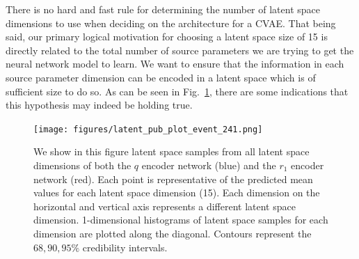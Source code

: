 %
%

There is no hard and fast rule for determining the number of latent 
space dimensions to use when deciding on the architecture for a \ac{CVAE}. 
That being said, our primary logical motivation for choosing a latent 
space size of 15 is directly related to the total number of source 
parameters we are trying to get the neural network model to learn. 
We want to ensure that the information in each source parameter dimension 
can be encoded in a latent space which is of sufficient size to do so. 
As can be seen in Fig.~\ref{fig:latent_corner_0}, there are 
some indications that this hypothesis may indeed be holding true. 

%
%
\begin{figure}
    \texttt{[image: figures/latent\_pub\_plot\_event\_241.png]}
    \caption[Latent space samples corner plot for a test sample in the \texttt{VItamin} paper training set.]{\label{fig:latent_corner_0} We show in this figure latent space samples from all latent space dimensions of both the $q$ encoder network (blue) and the $r_1$ encoder network (red). Each point is representative of the predicted mean values for each latent space dimension (15). Each dimension on the horizontal and vertical axis represents a different latent space dimension. 1-dimensional histograms of latent space samples for each dimension are plotted along the diagonal. Contours represent the $68, 90, 95\%$ credibility intervals.}
\end{figure}

